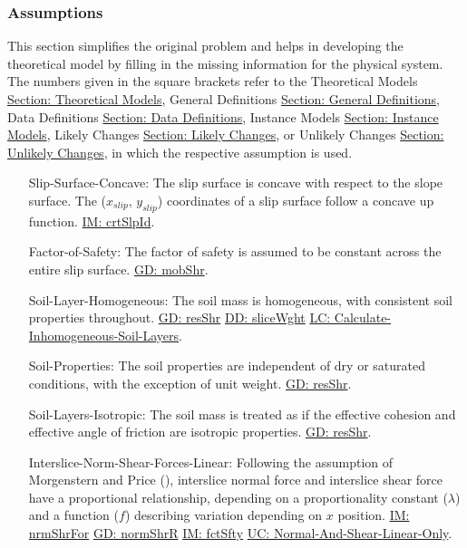 \documentclass[12pt]{article}
\begin{document}
\subsubsection{Assumptions}
\label{Sec:Assumps}
This section simplifies the original problem and helps in developing the theoretical model by filling in the missing information for the physical system. The numbers given in the square brackets refer to the Theoretical Models \hyperref[Sec:TMs]{Section: Theoretical Models}, General Definitions \hyperref[Sec:GDs]{Section: General Definitions}, Data Definitions \hyperref[Sec:DDs]{Section: Data Definitions}, Instance Models \hyperref[Sec:IMs]{Section: Instance Models}, Likely Changes \hyperref[Sec:LCs]{Section: Likely Changes}, or Unlikely Changes \hyperref[Sec:UCs]{Section: Unlikely Changes}, in which the respective assumption is used.
\begin{itemize}
\item[Slip-Surface-Concave:\phantomsection\label{assumpSSC}]The slip surface is concave with respect to the slope surface. The (${x_{slip}}$, ${y_{slip}}$) coordinates of a slip surface follow a concave up function. \hyperref[IM:crtSlpId]{IM: crtSlpId}.
\item[Factor-of-Safety:\phantomsection\label{assumpFOS}]The factor of safety is assumed to be constant across the entire slip surface. \hyperref[GD:mobShr]{GD: mobShr}.
\item[Soil-Layer-Homogeneous:\phantomsection\label{assumpSLH}]The soil mass is homogeneous, with consistent soil properties throughout. \hyperref[GD:resShr]{GD: resShr} \hyperref[DD:sliceWght]{DD: sliceWght} \hyperref[LC_inhomogeneous]{LC: Calculate-Inhomogeneous-Soil-Layers}.
\item[Soil-Properties:\phantomsection\label{assumpSP}]The soil properties are independent of dry or saturated conditions, with the exception of unit weight. \hyperref[GD:resShr]{GD: resShr}.
\item[Soil-Layers-Isotropic:\phantomsection\label{assumpSLI}]The soil mass is treated as if the effective cohesion and effective angle of friction are isotropic properties. \hyperref[GD:resShr]{GD: resShr}.
\item[Interslice-Norm-Shear-Forces-Linear:\phantomsection\label{assumpINSFL}]Following the assumption of Morgenstern and Price (\cite{morgenstern1965}), interslice normal force and interslice shear force have a proportional relationship, depending on a proportionality constant ($λ$) and a function ($f$) describing variation depending on $x$ position. \hyperref[IM:nrmShrFor]{IM: nrmShrFor} \hyperref[GD:normShrR]{GD: normShrR} \hyperref[IM:fctSfty]{IM: fctSfty} \hyperref[UC_normshearlinear]{UC: Normal-And-Shear-Linear-Only}.

\end{itemize}
\end{document}

